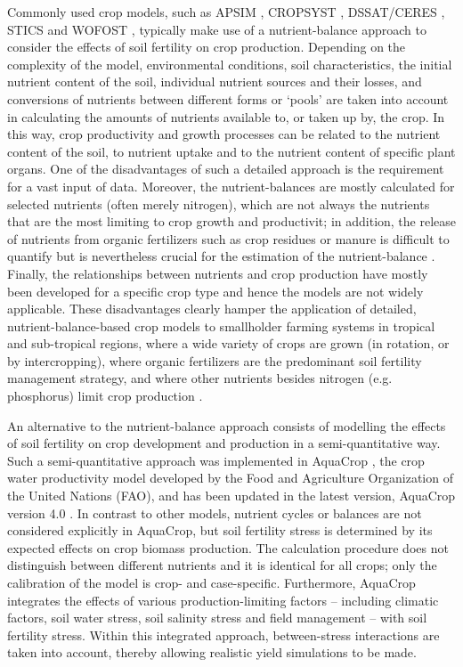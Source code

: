 Commonly used crop models, such as APSIM \parencite{keating2003}, CROPSYST \parencite{stockle2003}, DSSAT/CERES \parencite{jones2003}, STICS \parencite{brisson2003} and WOFOST \parencite{boogaard2014}, typically make use of a nutrient-balance approach to consider the effects of soil fertility on crop production. Depending on the complexity of the model, environmental conditions, soil characteristics, the initial nutrient content of the soil, individual nutrient sources and their losses, and conversions of nutrients between different forms or `pools' are taken into account in calculating the amounts of nutrients available to, or taken up by, the crop. In this way, crop productivity and growth processes can be related to the nutrient content of the soil, to nutrient uptake and to the nutrient content of specific plant organs. One of the disadvantages of such a detailed approach is the requirement for a vast input of data. Moreover, the nutrient-balances are mostly calculated for selected nutrients (often merely nitrogen), which are not always the nutrients that are the most limiting to crop growth and productivit\parencite{probert2000,probert2004,brisson2003}; in addition, the release of nutrients from organic fertilizers such as crop residues or manure is difficult to quantify but is nevertheless crucial for the estimation of the nutrient-balance \parencite{probert2004a,gijsman2002}. Finally, the relationships between nutrients and crop production have mostly been developed for a specific crop type and hence the models are not widely applicable. These disadvantages clearly hamper the application of detailed, nutrient-balance-based crop models to smallholder farming systems in tropical and sub-tropical regions, where a wide variety of crops are grown (in rotation, or by intercropping), where organic fertilizers are the predominant soil fertility management strategy, and where other nutrients besides nitrogen (e.g. phosphorus) limit crop production \parencite{delve2009,whitbread2010}. 

An alternative to the nutrient-balance approach consists of modelling the effects of soil fertility on crop development and production in a semi-quantitative way. Such a semi-quantitative approach was implemented in AquaCrop \parencite{hsiao2009,steduto2009,raes2009}, the crop water productivity model developed by the Food and Agriculture Organization of the United Nations (FAO), and has been updated in the latest version, AquaCrop version 4.0 \parencite{raes2012}. In contrast to other models, nutrient cycles or balances are not considered explicitly in AquaCrop, but soil fertility stress is determined by its expected effects on crop biomass production. The calculation procedure does not distinguish between different nutrients and it is identical for all crops; only the calibration of the model is crop- and case-specific. Furthermore, AquaCrop integrates the effects of various production-limiting factors – including climatic factors, soil water stress, soil salinity stress and field management – with soil fertility stress. Within this integrated approach, between-stress interactions are taken into account, thereby allowing realistic yield simulations to be made.

